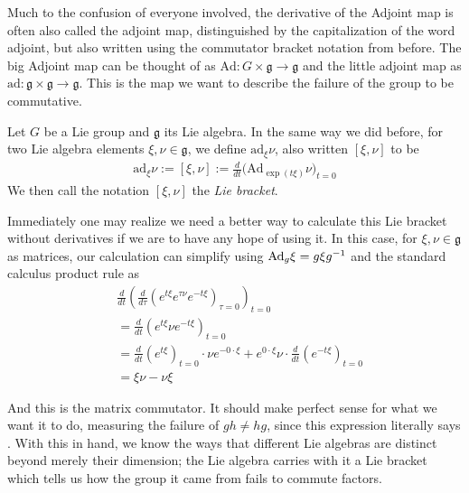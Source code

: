 \documentclass[11pt]{article}
\begin{document}
Much to the confusion of everyone involved, the derivative of the Adjoint map is often also called the adjoint map, distinguished by the capitalization of the word adjoint, but also written using the commutator bracket notation from before. The big Adjoint map can be thought of as $\mathrm{Ad}\colon G \times \mathfrak{g} \to \mathfrak{g}$ and the little adjoint map as $\mathrm{ad} \colon \mathfrak{g} \times \mathfrak{g} \to \mathfrak{g}$. This is the map we want to describe the failure of the group to be commutative.

\begin{definition}
Let $G$ be a Lie group and $\mathfrak{g}$ its Lie algebra. In the same way we did before, for two Lie algebra elements $\xi,\nu \in \mathfrak{g}$, we define $\mathrm{ad}_{\xi} \nu$, also written $[\xi,\nu]$ to be \begin{align*}
\mathrm{ad}_\xi \nu := [\xi,\nu] := \frac{d}{dt} \big(\mathrm{Ad}_{\exp(t\xi)} \nu \big)_{t=0}
\end{align*}
We then call the notation $[\xi,\nu]$ the \emph{Lie bracket}.
\end{definition}

Immediately one may realize we need a better way to calculate this Lie bracket without derivatives if we are to have any hope of using it. In this case, for $\xi,\nu \in \mathfrak{g}$ as matrices, our calculation can simplify using $\mathrm{Ad}_g \xi = g \xi g^{-1}$ and the standard calculus product rule as \begin{align*}
& \frac{d}{dt} \left(\frac{d}{d\tau} \left(e^{t\xi} e^{\tau \nu} e^{-t \xi} \right)_{\tau = 0}\right)_{t=0} \\
&= \frac{d}{dt} \left( e^{t\xi} \nu e^{-t \xi} \right)_{t=0} \\
&= \frac{d}{dt} \left( e^{t\xi} \right)_{t=0} \cdot \nu e^{-0 \cdot \xi} + e^{0 \cdot \xi} \nu \cdot \frac{d}{dt} \left( e^{-t \xi} \right)_{t=0} \\
&= \xi \nu - \nu \xi
\end{align*}

And this is the matrix commutator. It should make perfect sense for what we want it to do, measuring the failure of $gh \neq hg$, since this expression literally says . With this in hand, we know the ways that different Lie algebras are distinct beyond merely their dimension; the Lie algebra carries with it a Lie bracket which tells us how the group it came from fails to commute factors.
\end{document}
